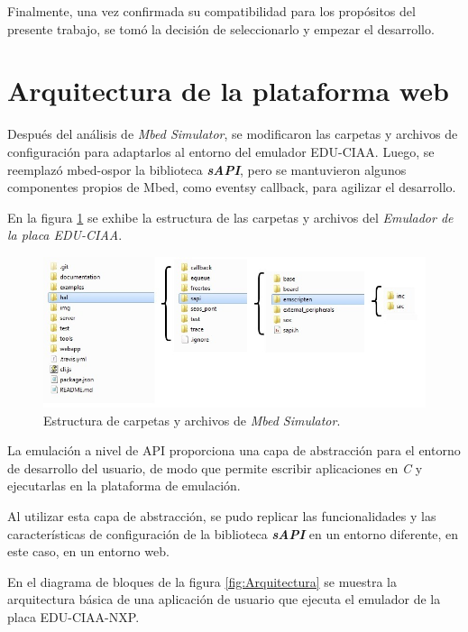 Finalmente, una vez confirmada su compatibilidad para los propósitos del presente trabajo, se tomó la decisión de seleccionarlo y empezar el desarrollo.


\section{Arquitectura de la plataforma web}

Después del análisis de \textit{Mbed Simulator}, se modificaron las carpetas y archivos de configuración para adaptarlos al entorno del emulador EDU-CIAA. Luego, se reemplazó \textquotedbl mbed-os\textquotedbl por la biblioteca \textit{\textbf{sAPI}}, pero se mantuvieron algunos componentes propios de Mbed, como \textquotedbl events\textquotedbl y \textquotedbl callback\textquotedbl, para agilizar el desarrollo.
  
En la figura \ref{fig:estructuraCiaa} se exhibe la estructura de las carpetas y archivos del  \textit{Emulador de la placa EDU-CIAA}.

\begin{figure}[ht]
	\centering
	\includegraphics[scale=.50]{./Figures/estructuraCiaa.jpg}
	\caption{Estructura de carpetas y archivos de \textit{Mbed Simulator}.}
	\label{fig:estructuraCiaa}
\end{figure}
 

La emulación a nivel de API proporciona una capa de abstracción para el entorno de desarrollo del usuario, de modo que permite escribir aplicaciones en \textit{C} y ejecutarlas en la plataforma de emulación. 

Al utilizar esta capa de abstracción, se pudo replicar las funcionalidades y las características de configuración de la biblioteca \textit{\textbf{sAPI}} en un entorno diferente, en este caso, en un entorno web.


En el diagrama de bloques de la figura \ref{fig:Arquitectura} se muestra la arquitectura básica de una aplicación de usuario que ejecuta el emulador de la placa EDU-CIAA-NXP.


